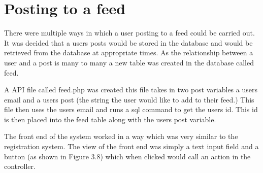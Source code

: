 \section{Posting to a feed}
There were multiple ways in which a user posting to a feed could be carried out. It was decided that a users posts would be stored in the database and would be retrieved from the database at appropriate times. As the relationship between a user and a post is many to many a new table was created in the database called feed. 

A API file called feed.php was created this file takes in two post variables a users email and a users post (the string the user would like to add to their feed.) This file then uses the users email and runs a sql command to get the users id. This id is then placed into the feed table along with the users post variable.

The front end of the system worked in a way which was very similar to the registration system. The view of the front end was simply a text input field and a button (as shown in Figure 3.8) which when clicked would call an action in the controller.

